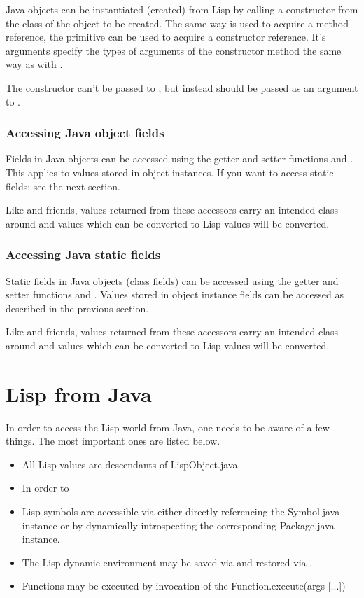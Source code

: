 \documentclass[10pt]{book}
\begin{document}
Java objects can be instantiated (created) from Lisp by calling
a constructor from the class of the object to be created. The same way
 is used to acquire a method reference, the
 primitive can be used to acquire a constructor
reference. It's arguments specify the types of arguments of the constructor
method the same way as with .

The constructor can't be passed to , but instead should
be passed as an argument to .

\subsubsection{Accessing Java object fields}

Fields in Java objects can be accessed using the getter and setter functions
 and . This applies to values stored in object
instances. If you want to access static fields: see the next section.

Like  and friends, values returned from these accessors carry
an intended class around and values which can be converted to Lisp values will
be converted.

\subsubsection{Accessing Java static fields}

Static fields in Java objects (class fields) can be accessed using the getter
and setter functions  and . Values
stored in object instance fields can be accessed as described in the previous
section.

Like  and friends, values returned from these accessors carry
an intended class around and values which can be converted to Lisp values will
be converted.

\section{Lisp from Java}

In order to access the Lisp world from Java, one needs to be aware
of a few things. The most important ones are listed below.

\begin{itemize}
\item All Lisp values are descendants of LispObject.java
\item In order to 
\item Lisp symbols are accessible via either directly referencing the
  Symbol.java instance or by dynamically introspecting the
  corresponding Package.java instance.
\item The Lisp dynamic environment may be saved via
   and restored via
  .
\item Functions may be executed by invocation of the
  Function.execute(args [...]) 
\end{itemize}
\end{document}
